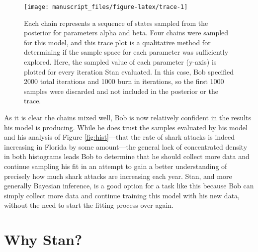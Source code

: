 \documentclass[
  12pt,
]{book}
\theoremstyle{definition}
\theoremstyle{definition}
\theoremstyle{definition}
\theoremstyle{remark}
\begin{document}
\begin{figure}

{\centering \texttt{[image: manuscript\_files/figure-latex/trace-1]} 

}

\caption{Each chain represents a sequence of states sampled from the posterior for parameters alpha and beta. Four chains were sampled for this model, and this trace plot is a qualitative method for determining if the sample space for each parameter was sufficiently explored. Here, the sampled value of each parameter (y-axis) is plotted for every iteration Stan evaluated. In this case, Bob specified 2000 total iterations and 1000 burn in iterations, so the first 1000 samples were discarded and not included in the posterior or the trace.}\label{fig:trace}
\end{figure}

As it is clear the chains mixed well, Bob is now relatively confident in the results his model is producing. While he does trust the samples evaluated by his model and his analysis of Figure \ref{fig:hist}---that the rate of shark attacks is indeed increasing in Florida by some amount---the general lack of concentrated density in both histograms leads Bob to determine that he should collect more data and continue sampling his fit in an attempt to gain a better understanding of precisely how much shark attacks are increasing each year.
Stan, and more generally Bayesian inference, is a good option for a task like this because Bob can simply collect more data and continue training this model with his new data, without the need to start the fitting process over again.

\hypertarget{why-stan}{%
\section{Why Stan?}\label{why-stan}}
\end{document}
